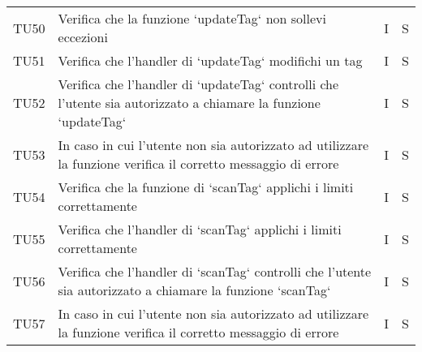 \begin{center}
\begin{longtable}[!h]{p{45px} p{255px} p{35px} p{35px}}
        TU50          & Verifica che la funzione `updateTag` non sollevi eccezioni                                                                                                                                       & I              & S              \\
        TU51          & Verifica che l'handler di `updateTag` modifichi un tag                                                                                                                                           & I              & S              \\
        TU52          & Verifica che l'handler di `updateTag` controlli che l'utente sia autorizzato a chiamare la funzione `updateTag`                                                                                  & I              & S              \\
        TU53          & In caso in cui l'utente non sia autorizzato ad utilizzare la funzione verifica il corretto messaggio di errore                                                                                   & I              & S              \\

        TU54          & Verifica che la funzione di `scanTag` applichi i limiti correttamente                                                                                                                            & I              & S              \\
        TU55          & Verifica che l'handler di `scanTag` applichi i limiti correttamente                                                                                                                              & I              & S              \\
        TU56          & Verifica che l'handler di `scanTag` controlli che l'utente sia autorizzato a chiamare la funzione `scanTag`                                                                                      & I              & S              \\
        TU57          & In caso in cui l'utente non sia autorizzato ad utilizzare la funzione verifica il corretto messaggio di errore                                                                                   & I              & S              \\
    \end{longtable}
\end{center}

